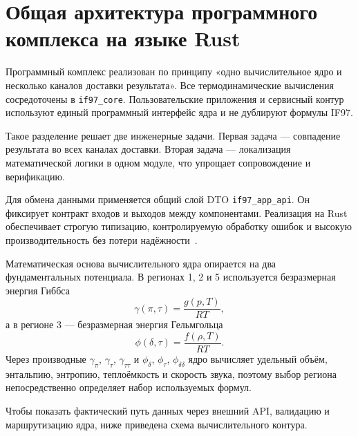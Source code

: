 \section{Общая архитектура программного комплекса на языке Rust}

Программный комплекс реализован по принципу
«одно вычислительное ядро и несколько каналов доставки результата».
Все термодинамические вычисления сосредоточены в \texttt{if97\_core}.
Пользовательские приложения и сервисный контур
используют единый программный интерфейс ядра и не дублируют формулы IF97.

Такое разделение решает две инженерные задачи.
Первая задача --- совпадение результата во всех каналах доставки.
Вторая задача --- локализация математической логики в одном модуле,
что упрощает сопровождение и верификацию.

Для обмена данными применяется общий слой DTO \texttt{if97\_app\_api}.
Он фиксирует контракт входов и выходов между компонентами.
Реализация на Rust обеспечивает строгую типизацию,
контролируемую обработку ошибок и высокую производительность
без потери надёжности~\cite{rust_book}.

Математическая основа вычислительного ядра опирается на два фундаментальных потенциала.
В регионах 1, 2 и 5 используется безразмерная энергия Гиббса
\begin{equation}
\gamma(\pi,\tau)=\frac{g(p,T)}{RT},
\end{equation}
а в регионе 3 --- безразмерная энергия Гельмгольца
\begin{equation}
\phi(\delta,\tau)=\frac{f(\rho,T)}{RT}.
\end{equation}
Через производные \(\gamma_{\pi}\), \(\gamma_{\tau}\), \(\gamma_{\tau\tau}\)
и \(\phi_{\delta}\), \(\phi_{\tau}\), \(\phi_{\delta\delta}\)
ядро вычисляет удельный объём, энтальпию, энтропию, теплоёмкость и скорость звука,
поэтому выбор региона непосредственно определяет набор используемых формул.

Чтобы показать фактический путь данных через внешний API, валидацию и маршрутизацию ядра,
ниже приведена схема вычислительного контура.

